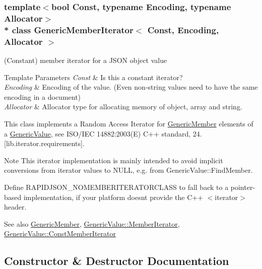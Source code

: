 \subsubsection*{template$<$bool Const, typename Encoding, typename Allocator$>$\\*
class Generic\+Member\+Iterator$<$ Const, Encoding, Allocator $>$}

(Constant) member iterator for a J\+S\+ON object value 


\begin{DoxyTemplParams}{Template Parameters}
{\em Const} & Is this a constant iterator? \\
\hline
{\em Encoding} & Encoding of the value. (Even non-\/string values need to have the same encoding in a document) \\
\hline
{\em Allocator} & Allocator type for allocating memory of object, array and string.\\
\hline
\end{DoxyTemplParams}
This class implements a Random Access Iterator for \hyperlink{structGenericMember}{Generic\+Member} elements of a \hyperlink{classGenericValue}{Generic\+Value}, see I\+S\+O/\+I\+EC 14882\+:2003(E) C++ standard, 24. \mbox{[}lib.\+iterator.\+requirements\mbox{]}.

\begin{DoxyNote}{Note}
This iterator implementation is mainly intended to avoid implicit conversions from iterator values to {\ttfamily N\+U\+LL}, e.\+g. from Generic\+Value\+::\+Find\+Member.

Define {\ttfamily R\+A\+P\+I\+D\+J\+S\+O\+N\+\_\+\+N\+O\+M\+E\+M\+B\+E\+R\+I\+T\+E\+R\+A\+T\+O\+R\+C\+L\+A\+SS} to fall back to a pointer-\/based implementation, if your platform doesn\textquotesingle{}t provide the C++ $<$iterator$>$ header.
\end{DoxyNote}
\begin{DoxySeeAlso}{See also}
\hyperlink{structGenericMember}{Generic\+Member}, \hyperlink{classGenericValue_a349b8faae61edc42b4289726820be439}{Generic\+Value\+::\+Member\+Iterator}, \hyperlink{classGenericValue_aac08c3e660a9036d3dcb8b10ff6c61f4}{Generic\+Value\+::\+Const\+Member\+Iterator} 
\end{DoxySeeAlso}


\subsection{Constructor \& Destructor Documentation}
